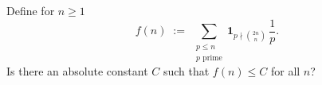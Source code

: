 Define for $n\ge 1$
\[
  f(n)\;:=\;\sum_{\substack{p\le n\\ p\text{ prime}}} \mathbf{1}_{p\nmid \binom{2n}{n}}\,\frac{1}{p}.
\]
Is there an absolute constant $C$ such that $f(n)\le C$ for all $n$?
